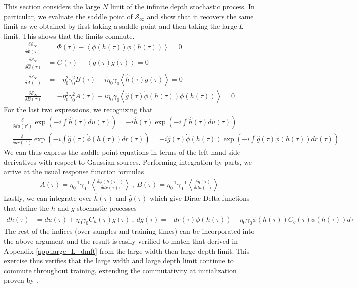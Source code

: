 \documentclass{article} %
\begin{document}
This section considers the large $N$ limit of the infinite depth stochastic process. In particular, we evaluate the saddle point of $\mathcal S_\infty$ and show that it recovers the same limit as we obtained by first taking a saddle point and then taking the large $L$ limit. This shows that the limits commute. 
\begin{align}
    \frac{\delta \mathcal S_\infty}{\delta \hat\Phi(\tau)} &= \Phi(\tau) - \left< \phi(h(\tau)) \phi(h(\tau))  \right> = 0 \nonumber
    \\
    \frac{\delta \mathcal S_\infty}{\delta \hat G(\tau)} &= G(\tau) - \left< g(\tau) g(\tau) \right> = 0 \nonumber
    \\
    \frac{\delta \mathcal S_\infty}{\delta A(\tau)} &= - \eta_0^2 \gamma_0^2 B(\tau) - i \eta_0 \gamma_0 \left< \hat{h}(\tau) g(\tau)  \right> = 0 \nonumber
    \\
    \frac{\delta \mathcal S_\infty}{\delta B(\tau)} &= - \eta_0^2 \gamma_0^2 A(\tau) - i \eta_0 \gamma_0  \left< \hat{g}(\tau) \dot\phi(h(\tau)) \phi(h(\tau))  \right> = 0
\end{align}
For the last two expressions, we recognizing that
\begin{align}
    &\frac{\delta}{\delta du(\tau') }\exp\left( - i \int \hat h(\tau) du(\tau)  \right) = - i \hat{h}(\tau)  \exp\left( - i \int \hat h(\tau) du(\tau)  \right) \nonumber
    \\
    &\frac{\delta}{\delta dr(\tau') }\exp\left( - i \int \hat g(\tau)  \dot\phi(h(\tau)) dr(\tau)  \right) = - i \hat{g}(\tau) \dot\phi(h(\tau)) \exp\left( - i \int \hat g(\tau) \dot\phi(h(\tau)) dr(\tau)  \right)
\end{align}
We can thus express the saddle point equations in terms of the left hand side derivatives with respect to Gaussian sources. Performing integration by parts, we arrive at the usual response function formulas
\begin{align}
    A(\tau) = \eta_0^{-1} \gamma_0^{-1} \left< \frac{\delta \phi(h(\tau))}{\delta dr(\tau))}\right> \ , \ B(\tau) =\eta_0^{-1} \gamma_0^{-1} \left< \frac{\delta g(\tau)}{\delta d u(\tau)} \right>
\end{align}
Lastly, we can integrate over $\hat h(\tau)$ and $\hat g(\tau)$ which give Dirac-Delta functions that define the $h$ and $g$ stochastic processes
\begin{align}
    dh(\tau) &= du(\tau) + \eta_0 \gamma_0 C_h(\tau) g(\tau) \ , \ 
    dg(\tau) = - dr(\tau)\dot\phi(h(\tau)) -  \eta_0 \gamma_0 \dot\phi(h(\tau)) C_g(\tau) \phi(h(\tau)) d\tau 
\end{align}
The rest of the indices (over samples and training times) can be incorporated into the above argument and the result is easily verified to match that derived in Appendix \ref{app:large_L_dmft} from the large width then large depth limit. This exercise thus verifies that the large width and large depth limit continue to commute throughout training, extending the commutativity at initialization proven by \cite{hayou2023width}. 
\end{document}
